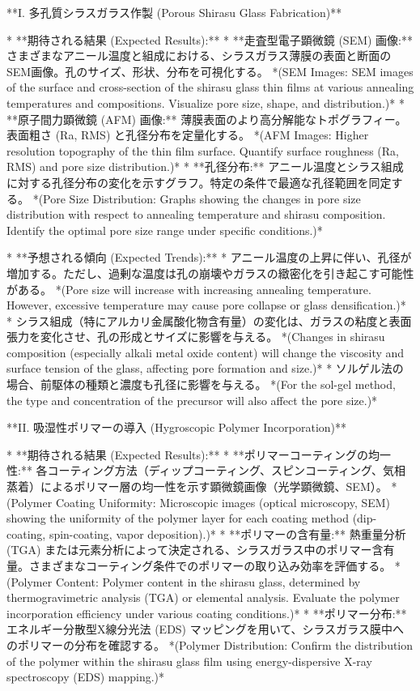 \documentclass{article}
\begin{document}
**I. 多孔質シラスガラス作製 (Porous Shirasu Glass Fabrication)**

*   **期待される結果 (Expected Results):**
    *   **走査型電子顕微鏡 (SEM) 画像:** さまざまなアニール温度と組成における、シラスガラス薄膜の表面と断面のSEM画像。孔のサイズ、形状、分布を可視化する。
        *(SEM Images: SEM images of the surface and cross-section of the shirasu glass thin films at various annealing temperatures and compositions. Visualize pore size, shape, and distribution.)*
    *   **原子間力顕微鏡 (AFM) 画像:** 薄膜表面のより高分解能なトポグラフィー。表面粗さ (Ra, RMS) と孔径分布を定量化する。
        *(AFM Images: Higher resolution topography of the thin film surface. Quantify surface roughness (Ra, RMS) and pore size distribution.)*
    *   **孔径分布:** アニール温度とシラス組成に対する孔径分布の変化を示すグラフ。特定の条件で最適な孔径範囲を同定する。
        *(Pore Size Distribution: Graphs showing the changes in pore size distribution with respect to annealing temperature and shirasu composition. Identify the optimal pore size range under specific conditions.)*

*   **予想される傾向 (Expected Trends):**
    *   アニール温度の上昇に伴い、孔径が増加する。ただし、過剰な温度は孔の崩壊やガラスの緻密化を引き起こす可能性がある。
        *(Pore size will increase with increasing annealing temperature. However, excessive temperature may cause pore collapse or glass densification.)*
    *   シラス組成（特にアルカリ金属酸化物含有量）の変化は、ガラスの粘度と表面張力を変化させ、孔の形成とサイズに影響を与える。
        *(Changes in shirasu composition (especially alkali metal oxide content) will change the viscosity and surface tension of the glass, affecting pore formation and size.)*
    *   ソルゲル法の場合、前駆体の種類と濃度も孔径に影響を与える。
        *(For the sol-gel method, the type and concentration of the precursor will also affect the pore size.)*

**II. 吸湿性ポリマーの導入 (Hygroscopic Polymer Incorporation)**

*   **期待される結果 (Expected Results):**
    *   **ポリマーコーティングの均一性:** 各コーティング方法（ディップコーティング、スピンコーティング、気相蒸着）によるポリマー層の均一性を示す顕微鏡画像（光学顕微鏡、SEM）。
        *(Polymer Coating Uniformity: Microscopic images (optical microscopy, SEM) showing the uniformity of the polymer layer for each coating method (dip-coating, spin-coating, vapor deposition).)*
    *   **ポリマーの含有量:** 熱重量分析 (TGA) または元素分析によって決定される、シラスガラス中のポリマー含有量。さまざまなコーティング条件でのポリマーの取り込み効率を評価する。
        *(Polymer Content: Polymer content in the shirasu glass, determined by thermogravimetric analysis (TGA) or elemental analysis. Evaluate the polymer incorporation efficiency under various coating conditions.)*
    *   **ポリマー分布:** エネルギー分散型X線分光法 (EDS) マッピングを用いて、シラスガラス膜中へのポリマーの分布を確認する。
        *(Polymer Distribution: Confirm the distribution of the polymer within the shirasu glass film using energy-dispersive X-ray spectroscopy (EDS) mapping.)*
\end{document}
